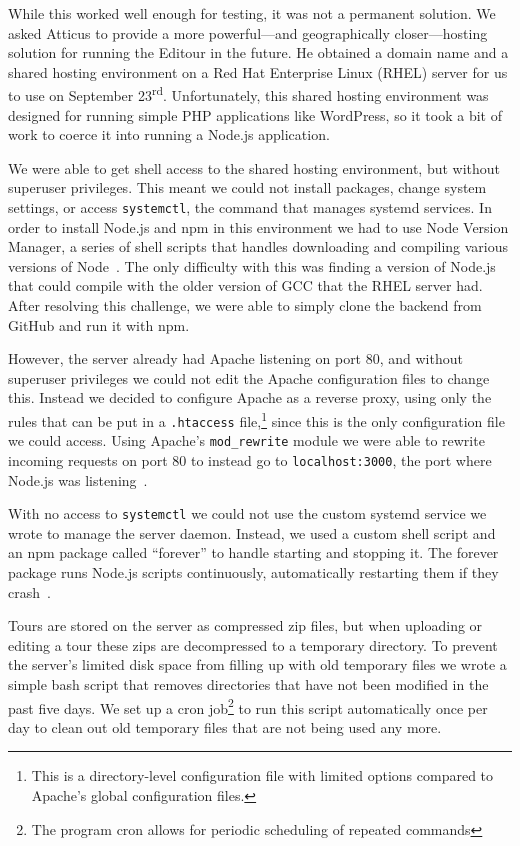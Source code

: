 \documentclass[a4paper, 10pt, american, titlepage]{article}
\begin{document}
While this worked well enough for testing, it was not a permanent solution. We
asked Atticus to provide a more powerful---and geographically closer---hosting
solution for running the Editour in the future. He obtained a domain name and a
shared hosting environment on a Red Hat Enterprise Linux (RHEL) server for us to
use on September 23\textsuperscript{rd}. Unfortunately, this shared hosting
environment was designed for running simple PHP applications like WordPress, so
it took a bit of work to coerce it into running a Node.js application.

We were able to get shell access to the shared hosting environment, but without
superuser privileges. This meant we could not install packages, change system
settings, or access \texttt{systemctl}, the command that manages systemd
services. In order to install Node.js and npm in this environment we had to use
Node Version Manager, a series of shell scripts that handles downloading and
compiling various versions of Node~\autocite{nvmsh2019}.  The only difficulty
with this was finding a version of Node.js that could compile with the older
version of GCC that the RHEL server had. After resolving this challenge, we were
able to simply clone the backend from GitHub and run it with npm.

However, the server already had Apache listening on port 80, and without
superuser privileges we could not edit the Apache configuration files to change
this. Instead we decided to configure Apache as a reverse proxy, using only the
rules that can be put in a \texttt{.htaccess} file,\footnote{This is a
directory-level configuration file with limited options compared to Apache's
global configuration files.} since this is the only configuration file we could
access. Using Apache's \texttt{mod\_rewrite} module we were able to rewrite
incoming requests on port 80 to instead go to \texttt{localhost:3000}, the port
where Node.js was listening~\autocite{apache2019}.

With no access to \texttt{systemctl} we could not use the custom systemd service
we wrote to manage the server daemon. Instead, we used a custom shell script and
an npm package called ``forever'' to handle starting and stopping it. The
forever package runs Node.js scripts continuously, automatically restarting them
if they crash~\autocite{robbins2019}.

Tours are stored on the server as compressed zip files, but when uploading or
editing a tour these zips are decompressed to a temporary directory. To prevent
the server's limited disk space from filling up with old temporary files we
wrote a simple bash script that removes directories that have not been modified
in the past five days. We set up a cron job\footnote{The program cron allows for
periodic scheduling of repeated commands} to run this script automatically once
per day to clean out old temporary files that are not being used any more.
\end{document}
